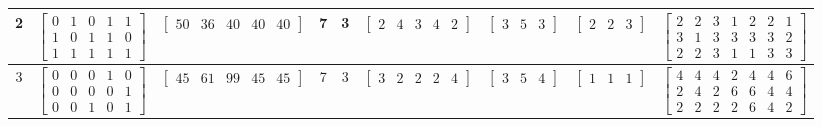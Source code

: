 \documentclass[11pt]{article}
\begin{document}
\begin{xltabular}{\textwidth}{|c|c|c|c|c|c|c|c|c|}
2 &
$\begin{bmatrix}
  0  &  1  &  0  &  1  &  1 \\
  1  &  0  &  1  &  1  &  0 \\
  1  &  1  &  1  &  1  &  1
\end{bmatrix}$ &
$\begin{bmatrix}
  50  &  36  &  40  &  40  &  40
\end{bmatrix}$ &
7 &
3 &
$\begin{bmatrix}
  2  &  4  &  3  &  4  &  2
\end{bmatrix}$ &
$\begin{bmatrix}
  3  &  5  &  3
\end{bmatrix}$ &
$\begin{bmatrix}
  2  &  2  &  3
\end{bmatrix}$ &
$\begin{bmatrix}
  2  &  2  &  3  &  1  &  2  &  2  &  1 \\
  3  &  1  &  3  &  3  &  3  &  3  &  2 \\
  2  &  2  &  3  &  1  &  1  &  3  &  3
\end{bmatrix}$ \\
\hline

3 &
$\begin{bmatrix}
  0  &  0  &  0  &  1  &  0 \\
  0  &  0  &  0  &  0  &  1 \\
  0  &  0  &  1  &  0  &  1
\end{bmatrix}$ &
$\begin{bmatrix}
  45  &  61  &  99  &  45  &  45
\end{bmatrix}$ &
7 &
3 &
$\begin{bmatrix}
  3  &  2  &  2  &  2  &  4
\end{bmatrix}$ &
$\begin{bmatrix}
  3  &  5  &  4
\end{bmatrix}$ &
$\begin{bmatrix}
  1  &  1  &  1
\end{bmatrix}$ &
$\begin{bmatrix}
  4  &  4  &  4  &  2  &  4  &  4  &  6 \\
  2  &  4  &  2  &  6  &  6  &  4  &  4 \\
  2  &  2  &  2  &  2  &  6  &  4  &  2
\end{bmatrix}$ \\
\hline


\end{xltabular}
\end{document}
